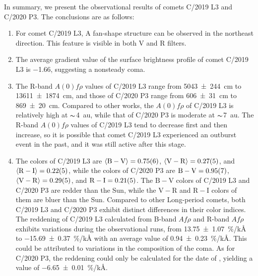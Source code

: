 In summary, we present the observational results of comets C/2019 L3 and C/2020 P3. The conclusions are as follows: 
\begin{enumerate}
    \item For comet C/2019 L3, A fan-shape structure can be observed in the northeast direction. This feature is visible in both V and R filters. 
    \item The average gradient value  of the surface brightness profile of comet C/2019 L3 is \num{-1.66}, suggesting a nonsteady coma. 
    \item The R-band $A(0)f\rho$ values of C/2019 L3 range from {\qty{5043 +- 244}{\cm}} to {\qty{13611 +- 1874}{\cm}}, and those of C/2020 P3 range from {\qty{606 +- 31}{\cm}} to {\qty{869 +- 20}{\cm}}. Compared to other works, the $A(0)f\rho$ of C/2019 L3 is relatively high at $\thicksim${\qty{4}{\astronomicalunit}}, while that of C/2020 P3 is moderate at $\thicksim${\SI{7}{\astronomicalunit}}. The R-band $A(0)f\rho$ values of C/2019 L3 tend to decrease first and then increase, so it is possible that comet C/2019 L3 experienced an outburst event in the past, and it was still active after this stage. 
    \item The colors of C/2019 L3 are  
        $\langle \mathrm{B-V} \rangle = \num{0.75 +- 0.06}$, 
        $\langle \mathrm{V-R} \rangle = \num{0.27 +- 0.05}$, and 
        $\langle \mathrm{R-I} \rangle = \num{0.22 +- 0.05}$,  
        while the colors of C/2020 P3 are 
        $\mathrm{B-V} = \num{0.95 +- 0.07}$, 
        $\langle \mathrm{V-R} \rangle = \num{0.29 +- 0.05}$, and 
        $\mathrm{R-I} = \num{0.21 +- 0.05}$. 
        The $\mathrm{B-V}$ colors of C/2019 L3 and C/2020 P3 are redder than the Sun, while the $\mathrm{V-R}$ and $\mathrm{R-I}$ colors of them are bluer than the Sun. Compared to other Long-period comets, both C/2019 L3 and C/2020 P3 exhibit distinct differences in their color indices. The reddening of C/2019 L3 calculated from B-band $Af\rho$ and R-band $Af\rho$ exhibits variations during the observational runs, from {\qty{13.75 +- 1.07}{\percent/\kilo\angstrom}} to {\qty{-15.69 +- 0.37}{\percent/\kilo\angstrom}} with an average value of {\qty{0.94 +- 0.23}{\percent/\kilo\angstrom}}. This could be attributed to  variations in the composition of the coma. As for C/2020 P3, the reddening could only be calculated for the date of , yielding a value of {\qty{-6.65 +- 0.01}{\percent/\kilo\angstrom}}. 
\end{enumerate}
